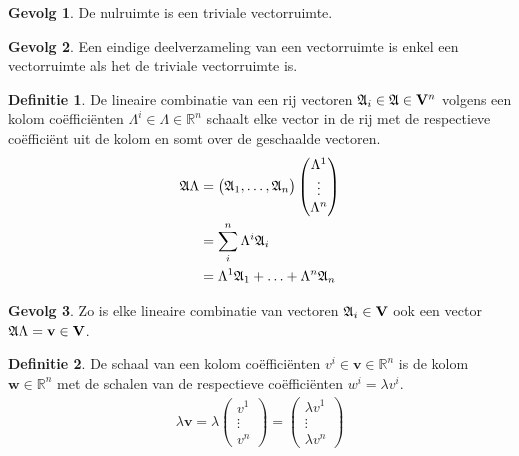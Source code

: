 \documentclass{amsart}
\theoremstyle{definition}
\newtheorem{dfn}{Definitie}[section]
\newtheorem{csq}{Gevolg}[section]
\newcommand{\realnums}{\mathbb{R}}
\newcommand{\realn}[1][n]{\realnums^{#1}}
\newcommand{\vecspace}[1][v]{\mathrm{\mathbf{\MakeUppercase#1}}}
\newcommand{\vecspacen}[1][n]{\vecspace^#1}
\newcommand{\vvec}[1][v]{\mathbf{#1}}
\newcommand{\vecrow}[1][a]{\mathfrak{\MakeUppercase{#1}}}
\newcommand{\rvec}[2][i]{{#2}_{#1}}
\newcommand{\rvecr}[2][i]{\rvec[#1]{\vecrow[#2]}}
\newcommand{\rveci}[1][i]{\rvecr[#1]{a}}
\begin{document}
\begin{csq}
    De nulruimte is een triviale vectorruimte.
\end{csq}

\begin{csq}
    Een eindige deelverzameling van een vectorruimte is enkel een vectorruimte als het de triviale vectorruimte is.
\end{csq}

\begin{dfn}
    De lineaire combinatie van een rij vectoren $\rveci \in \vecrow \in \vecspacen$ volgens een kolom coëfficiënten $\Lambda^i \in \Lambda \in \mathbb{R}^n$
    schaalt elke vector in de rij met de respectieve coëfficiënt uit de kolom en somt over de geschaalde vectoren.
    \begin{align*}
        \vecrow \Lambda
         & =
        \begin{pmatrix}
            \rveci[1], \ldots, \rveci[n]
        \end{pmatrix}
        \begin{pmatrix}
            \Lambda^1 \\
            \vdots       \\
            \Lambda^n
        \end{pmatrix}
        \\ & = \sum_i^n \Lambda^i \rveci
        \\ & = \Lambda^1 \rveci[1] + \ldots + \Lambda^n \rveci[n]
    \end{align*}
\end{dfn}

\begin{csq}
    Zo is elke lineaire combinatie van vectoren $\rveci \in \vecspace$ ook een vector $\vecrow \Lambda = \vvec \in \vecspace$.
\end{csq}

\begin{dfn}
    De schaal van een kolom coëfficiënten $v^i \in \vvec \in \realn$ is de kolom $\vvec[w] \in \realn$ met de schalen van de respectieve coëfficiënten ${w}^i = \lambda {v}^i$.
    \begin{align*}
        \lambda \vvec =
        \lambda
        \begin{pmatrix}
            v^1    \\
            \vdots \\
            v^n
        \end{pmatrix}
        =
        \begin{pmatrix}
            \lambda v^1 \\
            \vdots      \\
            \lambda v^n
        \end{pmatrix}
    \end{align*}
\end{dfn}
\end{document}
